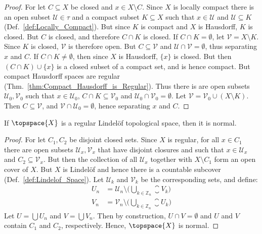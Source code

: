         \begin{proof}
            For let $C\subseteq{X}$ be closed and $x\in{X}\setminus{C}$. Since
            $X$ is locally compact there is an open subset
            $\mathcal{U}\in\tau$ and a compact subset $K\subseteq{X}$ such that
            $x\in\mathcal{U}$ and $\mathcal{U}\subseteq{K}$
            (Def.~\ref{def:Locally_Compact}). But since $K$ is compact and $X$
            is Hausdorff, $K$ is closed. But $C$ is closed, and therefore
            $C\cap{K}$ is closed. If $C\cap{K}=\emptyset$, let
            $\mathcal{V}=X\setminus{K}$. Since $K$ is closed,  $\mathcal{V}$ is
            therefore open. But $C\subseteq\mathcal{V}$ and
            $\mathcal{U}\cap\mathcal{V}=\emptyset$, thus separating $x$ and $C$.
            If $C\cap{K}\ne\emptyset$, then since $X$ is Hausdorff, $\{x\}$ is
            closed. But then $(C\cap{K})\cup\{x\}$ is a closed subset of a
            compact set, and is hence compact. But compact Hausdorff spaces are
            regular (Thm.~\ref{thm:Compact_Hausdorff_is_Regular}). Thus there is
            are open subsets $\mathcal{U}_{0},\mathcal{V}_{0}$ such that
            $x\in\mathcal{U}_{0}$, $C\cap{K}\subseteq\mathcal{V}_{0}$ and
            $\mathcal{U}_{0}\cap\mathcal{V}_{0}=\emptyset$.
            Let $\mathcal{V}=\mathcal{V}_{0}\cup(X\setminus{K})$. Then
            $C\subseteq\mathcal{V}$, and
            $\mathcal{V}\cap\mathcal{U}_{0}=\emptyset$, hence separating
            $x$ and $C$.
        \end{proof}
        \begin{theorem}
            \label{thm:Regular_Lindelof_is_Normal}%
            If $\topspace{X}$ is a regular Lindel\"{o}f topological space,
            then it is normal.
        \end{theorem}
        \begin{proof}
            For let $C_{1},C_{2}$ be disjoint closed sets. Since
            $X$ is regular, for all $x\in{C}_{1}$ there are open subsets
            $\mathcal{U}_{x},\mathcal{V}_{x}$ that have disjoint closures
            and such that $x\in\mathcal{U}_{x}$ and
            $C_{2}\subseteq\mathcal{V}_{x}$. But then the collection of all
            $\mathcal{U}_{x}$ together with $X\setminus{C}_{1}$ form an open
            cover of $X$. But $X$ is Lindel\"{o}f and hence there is a
            countable subcover (Def.~\ref{def:Lindelof_Space}). Let
            $\mathcal{U}_{k}$ and $\mathcal{V}_{k}$ be the corresponding
            sets, and define:
            \begin{align}
                U_{n}&=\mathcal{U}_{n}\setminus\Big(
                    \bigcup_{k\in\mathbb{Z}_{n}}\closure{V_{k}}
                \Big)\\
                V_{n}&=\mathcal{V}_{n}\setminus\Big(
                    \bigcup_{k\in\mathbb{Z}_{n}}\closure{U_{k}}
                \Big)
            \end{align}
            Let $U=\bigcup{U}_{n}$ and $V=\bigcup{V}_{n}$. Then by
            construction, $U\cap{V}=\emptyset$ and $U$ and $V$ contain
            $C_{1}$ and $C_{2}$, respectively. Hence, $\topspace{X}$ is
            normal.
        \end{proof}

